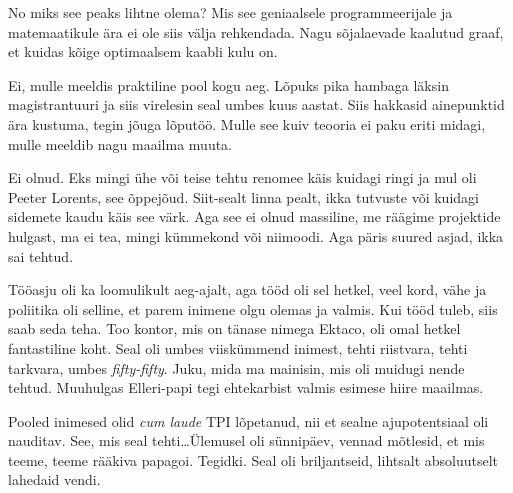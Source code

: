 
No miks see peaks lihtne olema? Mis see geniaalsele programmeerijale ja 
matemaatikule ära ei ole siis välja rehkendada. Nagu sõjalaevade kaalutud 
graaf, et kuidas kõige optimaalsem kaabli kulu on. 


Ei, mulle meeldis praktiline pool kogu aeg. Lõpuks pika hambaga läksin 
magistrantuuri ja siis virelesin seal umbes kuus aastat. Siis hakkasid 
ainepunktid  ära kustuma, tegin jõuga lõputöö. Mulle see kuiv teooria ei paku 
eriti midagi, mulle meeldib nagu maailma muuta. 


Ei olnud. Eks mingi ühe või teise tehtu renomee käis kuidagi ringi ja mul oli 
Peeter Lorents, see õppejõud. Siit-sealt linna 
pealt,  ikka tutvuste  või kuidagi sidemete kaudu käis see värk. Aga see ei 
olnud massiline, me räägime projektide hulgast, ma ei tea, mingi kümmekond või 
niimoodi. Aga päris suured asjad, ikka sai tehtud.

Tööasju oli ka loomulikult aeg-ajalt, aga tööd oli sel hetkel, veel kord, vähe 
ja poliitika oli selline, et parem inimene olgu olemas ja valmis. Kui tööd 
tuleb, siis saab seda teha. Too  kontor, mis on tänase nimega 
Ektaco, oli omal hetkel  fantastiline koht. Seal oli umbes 
viiskümmend inimest, tehti riistvara, tehti tarkvara, umbes \emph{fifty-fifty}. 
Juku, mida ma mainisin, mis oli muidugi nende tehtud. Muuhulgas Elleri-papi 
tegi ehtekarbist valmis esimese hiire maailmas.

Pooled inimesed olid \emph{cum laude} TPI lõpetanud, nii et sealne 
ajupotentsiaal oli nauditav. See, mis seal tehti\ldots Ülemusel oli sünnipäev, 
vennad mõtlesid, et mis teeme, teeme rääkiva papagoi. Tegidki. Seal oli 
briljantseid, lihtsalt absoluutselt lahedaid vendi. 


